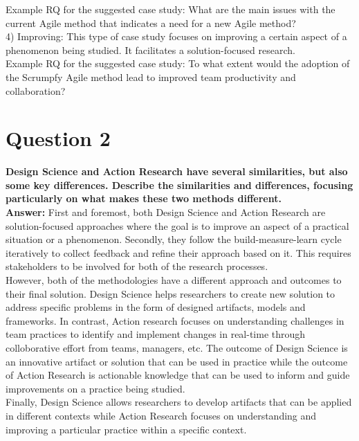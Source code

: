 \documentclass[conference]{IEEEtran}
\begin{document}
Example RQ for the suggested case study: What are the main issues with the current Agile method that indicates a need for a new Agile method?\\

4) Improving: This type of case study focuses on improving a certain aspect of a phenomenon being studied. It facilitates a solution-focused research.\\

Example RQ for the suggested case study: To what extent would the adoption of the Scrumpfy Agile method lead to improved team productivity and collaboration?

\section{Question 2}

\textbf{Design Science and Action Research have several similarities, but also some key differences. Describe the similarities and differences, focusing particularly on what makes these two methods different.}\\

\textbf{Answer:} First and foremost, both Design Science and Action Research are solution-focused approaches where the goal is to improve an aspect of a practical situation or a phenomenon. Secondly, they follow the build-measure-learn cycle iteratively to collect feedback and refine their approach based on it. This requires stakeholders to be involved for both of the research processes.\\

However, both of the methodologies have a different approach and outcomes to their final solution. Design Science helps researchers to create new solution to address specific problems in the form of designed artifacts, models and frameworks. In contrast, Action research focuses on understanding challenges in team practices to identify and implement changes in real-time through colloborative effort from teams, managers, etc. The outcome of Design Science is an innovative artifact or solution that can be used in practice while the outcome of Action Research is actionable knowledge that can be used to inform and guide improvements on a practice being studied.\\

Finally, Design Science allows researchers to develop artifacts that can be applied in different contexts while Action Research focuses on understanding and improving a particular practice within a specific context.
\end{document}

